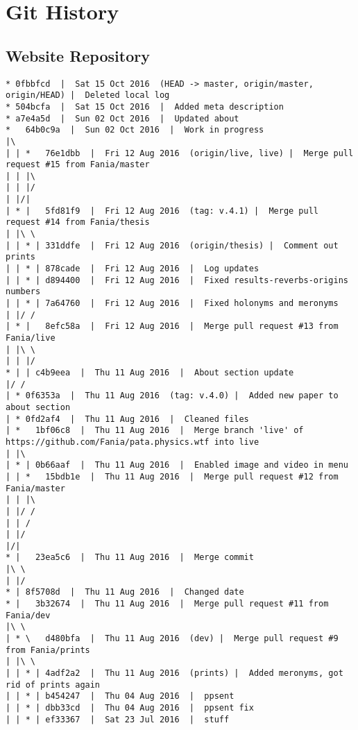 
\chapter{Git History}
\label{app:git}

\vspace{5cm}


\section{Website Repository}
\label{s:gitweb}

\begin{verbatim}
* 0fbbfcd  |  Sat 15 Oct 2016  (HEAD -> master, origin/master, origin/HEAD) |  Deleted local log
* 504bcfa  |  Sat 15 Oct 2016  |  Added meta description
* a7e4a5d  |  Sun 02 Oct 2016  |  Updated about
*   64b0c9a  |  Sun 02 Oct 2016  |  Work in progress
|\  
| | *   76e1dbb  |  Fri 12 Aug 2016  (origin/live, live) |  Merge pull request #15 from Fania/master
| | |\  
| | |/  
| |/|   
| * |   5fd81f9  |  Fri 12 Aug 2016  (tag: v.4.1) |  Merge pull request #14 from Fania/thesis
| |\ \  
| | * | 331ddfe  |  Fri 12 Aug 2016  (origin/thesis) |  Comment out prints
| | * | 878cade  |  Fri 12 Aug 2016  |  Log updates
| | * | d894400  |  Fri 12 Aug 2016  |  Fixed results-reverbs-origins numbers
| | * | 7a64760  |  Fri 12 Aug 2016  |  Fixed holonyms and meronyms
| |/ /  
| * |   8efc58a  |  Fri 12 Aug 2016  |  Merge pull request #13 from Fania/live
| |\ \  
| | |/  
* | | c4b9eea  |  Thu 11 Aug 2016  |  About section update
|/ /  
| * 0f6353a  |  Thu 11 Aug 2016  (tag: v.4.0) |  Added new paper to about section
| * 0fd2af4  |  Thu 11 Aug 2016  |  Cleaned files
| *   1bf06c8  |  Thu 11 Aug 2016  |  Merge branch 'live' of https://github.com/Fania/pata.physics.wtf into live
| |\  
| * | 0b66aaf  |  Thu 11 Aug 2016  |  Enabled image and video in menu
| | *   15bdb1e  |  Thu 11 Aug 2016  |  Merge pull request #12 from Fania/master
| | |\  
| |/ /  
| | /   
| |/    
|/|     
* |   23ea5c6  |  Thu 11 Aug 2016  |  Merge commit
|\ \  
| |/  
* | 8f5708d  |  Thu 11 Aug 2016  |  Changed date
* |   3b32674  |  Thu 11 Aug 2016  |  Merge pull request #11 from Fania/dev
|\ \  
| * \   d480bfa  |  Thu 11 Aug 2016  (dev) |  Merge pull request #9 from Fania/prints
| |\ \  
| | * | 4adf2a2  |  Thu 11 Aug 2016  (prints) |  Added meronyms, got rid of prints again
| | * | b454247  |  Thu 04 Aug 2016  |  ppsent
| | * | dbb33cd  |  Thu 04 Aug 2016  |  ppsent fix
| | * | ef33367  |  Sat 23 Jul 2016  |  stuff

\end{verbatim}
